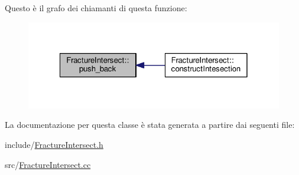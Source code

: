 Questo è il grafo dei chiamanti di questa funzione\-:
\nopagebreak
\begin{figure}[H]
\begin{center}
\leavevmode
\includegraphics[width=320pt]{classFractureIntersect_a01bc187a846208a47a13daeeb94b13f5_icgraph}
\end{center}
\end{figure}




La documentazione per questa classe è stata generata a partire dai seguenti file\-:\begin{DoxyCompactItemize}
\item 
include/\hyperlink{FractureIntersect_8h}{Fracture\-Intersect.\-h}\item 
src/\hyperlink{FractureIntersect_8cc}{Fracture\-Intersect.\-cc}\end{DoxyCompactItemize}

